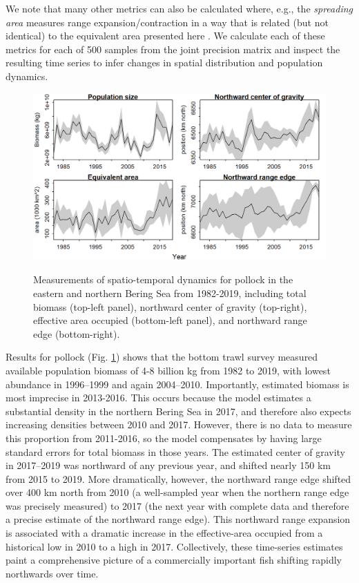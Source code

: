 We note that many other metrics can also be calculated where, e.g., the \textit{spreading area} measures range expansion/contraction in a way that is related (but not identical) to the equivalent area presented here \cite{woillez_notes_2009}.  We calculate each of these metrics for each of 500 samples from the joint precision matrix and inspect the resulting time series to infer changes in spatial distribution and population dynamics.  

\begin{figure}[!ht]
    \caption[Measurements of spatial dynamics for pollock]{Measurements of spatio-temporal dynamics for pollock in the eastern and northern Bering Sea from 1982-2019, including total biomass (top-left panel), northward center of gravity (top-right), effective area occupied (bottom-left panel), and northward range edge (bottom-right).}
    \centering
    \includegraphics[width=5.5in]{Chap_8/statistics.png}
    \label{fig:Chap8_pollock_timeseries}
\end{figure}

Results for pollock (Fig. \ref{fig:Chap8_pollock_timeseries}) shows that the bottom trawl survey measured available population biomass of 4-8 billion kg from 1982 to 2019, with lowest abundance in 1996--1999 and again 2004--2010.  Importantly, estimated biomass is most imprecise in 2013-2016.  This occurs because the model estimates a substantial density in the northern Bering Sea in 2017, and therefore also expects increasing densities between 2010 and 2017.  However, there is no data to measure this proportion from 2011-2016, so the model compensates by having large standard errors for total biomass in those years.  The estimated center of gravity in 2017--2019 was northward of any previous year, and shifted nearly 150 km from 2015 to 2019.  More dramatically, however, the northward range edge shifted over 400 km north from 2010 (a well-sampled year when the northern range edge was precisely measured) to 2017 (the next year with complete data and therefore a precise estimate of the northward range edge).  This northward range expansion is associated with a dramatic increase in the effective-area occupied from a historical low in 2010 to a high in 2017.  Collectively, these time-series estimates paint a comprehensive picture of a commercially important fish shifting rapidly northwards over time.  


